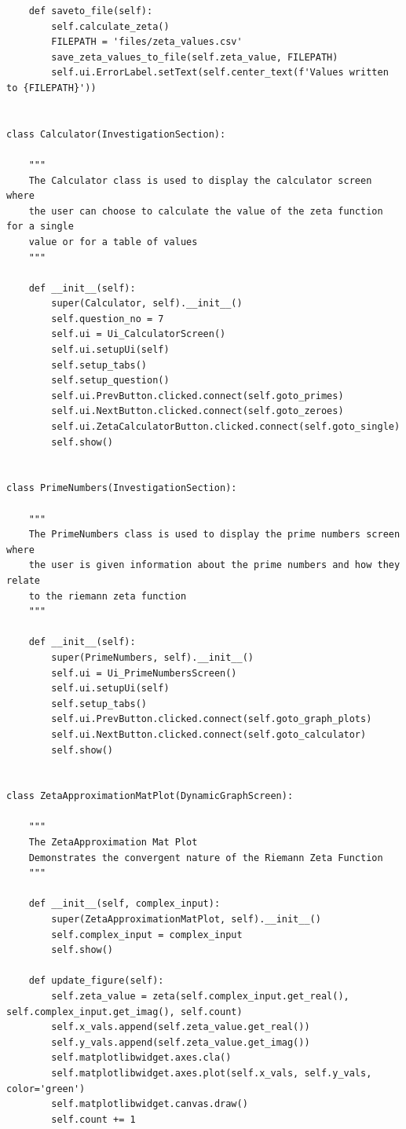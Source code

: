 \documentclass{article}
\begin{document}
\begin{lstlisting}
    def saveto_file(self):
        self.calculate_zeta()
        FILEPATH = 'files/zeta_values.csv'
        save_zeta_values_to_file(self.zeta_value, FILEPATH)
        self.ui.ErrorLabel.setText(self.center_text(f'Values written to {FILEPATH}'))


class Calculator(InvestigationSection):

    """
    The Calculator class is used to display the calculator screen where
    the user can choose to calculate the value of the zeta function for a single
    value or for a table of values
    """

    def __init__(self):
        super(Calculator, self).__init__()
        self.question_no = 7
        self.ui = Ui_CalculatorScreen()
        self.ui.setupUi(self)
        self.setup_tabs()
        self.setup_question()
        self.ui.PrevButton.clicked.connect(self.goto_primes)
        self.ui.NextButton.clicked.connect(self.goto_zeroes)
        self.ui.ZetaCalculatorButton.clicked.connect(self.goto_single)
        self.show()


class PrimeNumbers(InvestigationSection):

    """
    The PrimeNumbers class is used to display the prime numbers screen where
    the user is given information about the prime numbers and how they relate
    to the riemann zeta function
    """

    def __init__(self):
        super(PrimeNumbers, self).__init__()
        self.ui = Ui_PrimeNumbersScreen()
        self.ui.setupUi(self)
        self.setup_tabs()
        self.ui.PrevButton.clicked.connect(self.goto_graph_plots)
        self.ui.NextButton.clicked.connect(self.goto_calculator)
        self.show()


class ZetaApproximationMatPlot(DynamicGraphScreen):

    """
    The ZetaApproximation Mat Plot
    Demonstrates the convergent nature of the Riemann Zeta Function
    """

    def __init__(self, complex_input):
        super(ZetaApproximationMatPlot, self).__init__()
        self.complex_input = complex_input
        self.show()

    def update_figure(self):
        self.zeta_value = zeta(self.complex_input.get_real(), self.complex_input.get_imag(), self.count)
        self.x_vals.append(self.zeta_value.get_real())
        self.y_vals.append(self.zeta_value.get_imag())
        self.matplotlibwidget.axes.cla()
        self.matplotlibwidget.axes.plot(self.x_vals, self.y_vals, color='green')
        self.matplotlibwidget.canvas.draw()
        self.count += 1



\end{lstlisting}
\end{document}

